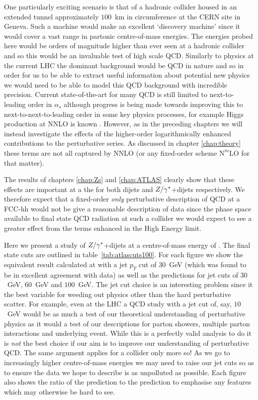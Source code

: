 	One particularly exciting scenario is that of a \htev hadronic collider housed in an extended tunnel
	approximately $100$~km in circumference at the CERN site in Geneva.  Such a machine would make an
	excellent `discovery machine' since it would cover a vast range in partonic centre-of-mass energies.
	The energies probed here would be orders of magnitude higher than ever seen at a hadronic collider
	and so this would be an invaluable test of high scale QCD.  Similarly to physics at the current LHC
	the dominant background would be QCD in nature and so in order for us to be able to extract useful
	information about potential new physics we would need to be able to model this QCD background with
	incredible precision.  Current state-of-the-art for many QCD is still limited to next-to-leading
	order in $\alpha_s$ although progress is being made towards improving this to next-to-next-to-leading
	order in some key physics processes, for example Higgs production at NNLO is known \cite{Catani:2008me}.
	However, as in the preceding chapters we will instead investigate the effects of the higher-order
	logarithmically enhanced contributions to the perturbative series.  As discussed in chapter \ref{chap:theory}
	these terms are not all captured by NNLO (or any fixed-order scheme $\text{N}^m$LO for that matter).

	The results of chapters \ref{chap:Zs} and \ref{chap:ATLAS} clearly show that these effects are important
	at a the \stev for both dijets and $Z/\gamma^*$+dijets respectively.  We therefore expect that a fixed-order
	\emph{only} perturbative description of QCD at a \htev FCC-hh would not be give a reasonable
	description of data since the phase space available to final state QCD radiation at such a collider we
	would expect to see a greater effect from the terms enhanced in the High Energy limit.

	Here we present a study of $Z/\gamma^*$+dijets at a centre-of-mass energy of \htev.  The final state cuts
	are outlined in table~\eqref{tab:atlascuts100}.  For each figure we show the equivalent result calculated
	at \stev with a jet $p_T$ cut of $30$~GeV (which was found to be in excellent agreement with data) as
	well as the \htev predictions for jet cuts of $30$~GeV, $60$~GeV and $100$~GeV.  The jet cut choice
	is an interesting problem since it the best variable for weeding out physics other than the hard
	perturbative scatter.  For example, even at the \stev LHC a QCD study with a jet cut of, say,
	$10$~GeV would be as much a test of our theoretical understanding of perturbative physics as it would
	a test of our descriptions for parton showers, multiple parton interactions and underlying event.
	While this is a perfectly valid analysis to do it is \emph{not} the best choice if our aim is to
	improve our understanding of perturbative QCD.  The same argument applies for a \htev collider
	only more so!  As we go to increasingly higher centre-of-mass energies we may need to raise our
	jet cuts so as to ensure the data we hope to describe is as unpolluted as possible.  Each figure
	also shows the ratio of the \htev prediction to the \stev prediction to emphasise any features
	which may otherwise be hard to see.


